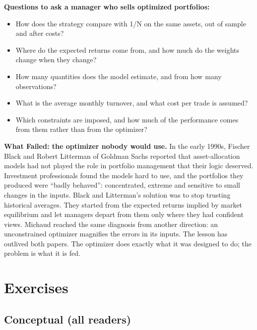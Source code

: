 \textbf{Questions to ask a manager who sells optimized portfolios:}

\begin{itemize}
  \item How does the strategy compare with 1/N on the same assets, out of sample and after costs?
  \item Where do the expected returns come from, and how much do the weights change when they change?
  \item How many quantities does the model estimate, and from how many observations?
  \item What is the average monthly turnover, and what cost per trade is assumed?
  \item Which constraints are imposed, and how much of the performance comes from them rather than from the optimizer?
\end{itemize}

\begin{callout}
\textbf{What Failed: the optimizer nobody would use.} In the early 1990s, Fischer Black and Robert Litterman of Goldman Sachs reported that asset-allocation models had not played the role in portfolio management that their logic deserved. Investment professionals found the models hard to use, and the portfolios they produced were ``badly behaved'': concentrated, extreme and sensitive to small changes in the inputs. Black and Litterman's solution was to stop trusting historical averages. They started from the expected returns implied by market equilibrium and let managers depart from them only where they had confident views. Michaud reached the same diagnosis from another direction: an unconstrained optimizer magnifies the errors in its inputs. The lesson has outlived both papers. The optimizer does exactly what it was designed to do; the problem is what it is fed.
\end{callout}

\section*{Exercises}

\subsection*{Conceptual (all readers)}

